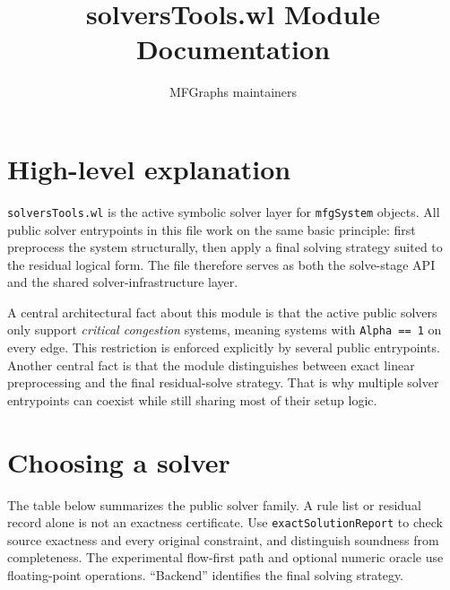 \documentclass[11pt]{article}
\title{solversTools.wl Module Documentation}
\author{MFGraphs maintainers}
\date{}
\begin{document}
\maketitle

\section{High-level explanation}

\texttt{solversTools.wl} is the active symbolic solver layer for \texttt{mfgSystem} objects. All public solver entrypoints in this file work on the same basic principle: first preprocess the system structurally, then apply a final solving strategy suited to the residual logical form. The file therefore serves as both the solve-stage API and the shared solver-infrastructure layer.

A central architectural fact about this module is that the active public solvers only support \emph{critical congestion} systems, meaning systems with \texttt{Alpha == 1} on every edge. This restriction is enforced explicitly by several public entrypoints. Another central fact is that the module distinguishes between exact linear preprocessing and the final residual-solve strategy. That is why multiple solver entrypoints can coexist while still sharing most of their setup logic.

\section{Choosing a solver}

The table below summarizes the public solver family. A rule list or residual record
alone is not an exactness certificate. Use \texttt{exactSolutionReport} to check
source exactness and every original constraint, and distinguish soundness from
completeness. The experimental flow-first path and optional numeric oracle use
floating-point operations. ``Backend'' identifies the final solving strategy.
\end{document}
